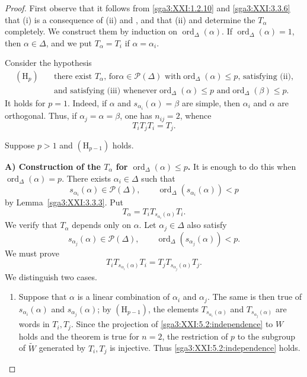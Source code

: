 \begin{proof}
First observe that it follows from
\ref{sga3:XXI:1.2.10} and \ref{sga3:XXI:3.3.6} that (i) is a
consequence of (ii) and , and that (ii) and  determine the
\(T_\alpha\) completely. We construct them by induction on
\(\operatorname{ord}_\Delta(\alpha)\). If
\(\operatorname{ord}_\Delta(\alpha)=1\), then \(\alpha\in\Delta\),
and we put \(T_\alpha=T_i\) if \(\alpha=\alpha_i\).

Consider the hypothesis
\[
\begin{split}
(\mathrm{H}_p)\quad&
\text{there exist \(T_\alpha\), for
\(\alpha\in\mathscr{P}(\Delta)\) with
\(\operatorname{ord}_\Delta(\alpha)\le p\), satisfying (ii),}\\
&\text{and satisfying (iii) whenever
\(\operatorname{ord}_\Delta(\alpha)\le p\) and
\(\operatorname{ord}_\Delta(\beta)\le p\).}
\end{split}
\]
It holds for \(p=1\). Indeed, if \(\alpha\) and
\(s_{\alpha_i}(\alpha)=\beta\) are simple, then \(\alpha_i\) and
\(\alpha\) are orthogonal. Thus, if
\(\alpha_j=\alpha=\beta\), one has \(n_{ij}=2\), whence
\[
 T_iT_jT_i=T_j.
\]

Suppose \(p>1\) and \((\mathrm{H}_{p-1})\) holds.

\medskip
\noindent\textbf{A) Construction of the \(T_\alpha\) for
\(\operatorname{ord}_\Delta(\alpha)\le p\).}
It is enough to do this when
\(\operatorname{ord}_\Delta(\alpha)=p\). There exists
\(\alpha_i\in\Delta\) such that
\[
 s_{\alpha_i}(\alpha)\in\mathscr{P}(\Delta),
 \qquad
 \operatorname{ord}_\Delta(s_{\alpha_i}(\alpha))<p
\]
by Lemma~\ref{sga3:XXI:3.3.3}. Put
\begin{equation}
\tag{\(\star\)}
\label{sga3:XXI:5.2:construction}
 T_\alpha=T_iT_{s_{\alpha_i}(\alpha)}T_i.
\end{equation}
We verify that \(T_\alpha\) depends only on \(\alpha\). Let
\(\alpha_j\in\Delta\) also satisfy
\[
 s_{\alpha_j}(\alpha)\in\mathscr{P}(\Delta),
 \qquad
 \operatorname{ord}_\Delta(s_{\alpha_j}(\alpha))<p.
\]
We must prove
\begin{equation}
\tag{\(+\)}
\label{sga3:XXI:5.2:independence}
 T_iT_{s_{\alpha_i}(\alpha)}T_i
 =T_jT_{s_{\alpha_j}(\alpha)}T_j.
\end{equation}
We distinguish two cases.

\begin{enumerate}
\item[(1)] Suppose that \(\alpha\) is a linear combination of
\(\alpha_i\) and \(\alpha_j\). The same is then true of
\(s_{\alpha_i}(\alpha)\) and \(s_{\alpha_j}(\alpha)\); by
\((\mathrm{H}_{p-1})\), the elements
\(T_{s_{\alpha_i}(\alpha)}\) and
\(T_{s_{\alpha_j}(\alpha)}\) are words in \(T_i,T_j\). Since the
projection of \eqref{sga3:XXI:5.2:independence} to \(W\) holds and
the theorem is true for \(n=2\), the restriction of \(p\) to the
subgroup of \(\widetilde W\) generated by \(T_i,T_j\) is injective.
Thus \eqref{sga3:XXI:5.2:independence} holds.


\end{enumerate}
\end{proof}
